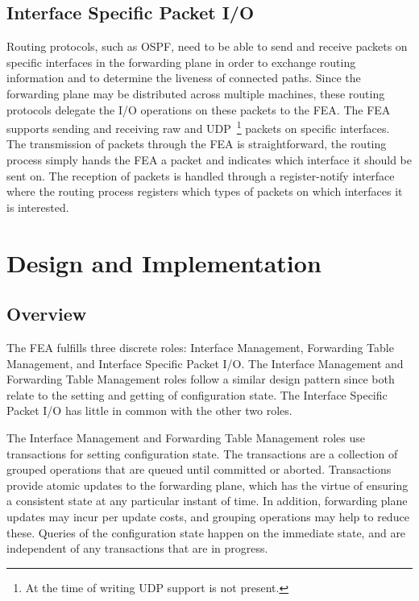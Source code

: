 \documentclass[11pt]{article}
\begin{document}
\subsection{Interface Specific Packet I/O}
\label{sec:introduction:interface_specific_packet_io}

Routing protocols, such as OSPF, need to be able to send and receive
packets on specific interfaces in the forwarding plane in order to
exchange routing information and to determine the liveness of
connected paths.  Since the forwarding plane may be distributed across
multiple machines, these routing protocols delegate the I/O operations
on these packets to the FEA.  The FEA supports sending and receiving
raw and UDP~\footnote{At the time of writing UDP support
is not present.}  packets on specific interfaces.  The transmission of
packets through the FEA is straightforward, the routing process simply
hands the FEA a packet and indicates which interface it should be sent
on.  The reception of packets is handled through a register-notify
interface where the routing process registers which types of packets
on which interfaces it is interested.

\section{Design and Implementation}
\label{sec:design_and_implementation}

\subsection{Overview}

The FEA fulfills three discrete roles: Interface Management, Forwarding
Table Management, and Interface Specific Packet I/O.  The Interface
Management and Forwarding Table Management roles follow a similar
design pattern since both relate to the setting and getting of
configuration state.  The Interface Specific Packet I/O has little in
common with the other two roles.  

The Interface Management and Forwarding Table Management roles use
transactions for setting configuration state.  The transactions are a
collection of grouped operations that are queued until committed or
aborted.  Transactions provide atomic updates to the forwarding plane,
which has the virtue of ensuring a consistent state at any particular
instant of time.  In addition, forwarding plane updates may incur per
update costs, and grouping operations may help to reduce
these. Queries of the configuration state happen on the immediate
state, and are independent of any transactions that are in progress.
\end{document}
